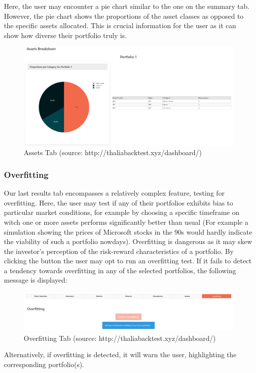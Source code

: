 \documentclass[main.tex]{subfiles}
\begin{document}
Here, the user may encounter a pie chart similar to the one on the summary tab. However, the pie chart shows the proportions of the asset classes as opposed to the specific assets allocated. This is crucial information for the user as it can show how diverse their portfolio truly is.

\begin{figure}[H]
   \centering
   \includegraphics[width=\textwidth]{08Appendices/081User/081Pictures/assets.png}
   \caption{Assets Tab (source: http://thaliabacktest.xyz/dashboard/)}
   \label{assets_tab}
\end{figure}

\subsubsection{Overfitting}

Our last results tab encompasses a relatively complex feature, testing for overfitting. Here, the user may test if any of their portfolios exhibits bias to particular market conditions, for example by choosing a specific timeframe on witch one or more assets performs significantly better than usual (For example a simulation showing the prices of Microsoft stocks in the 90s would hardly indicate the viability of such a portfolio nowdays). Overfitting is dangerous as it may skew the investor's perception of the risk-reward characteristics of a portfolio. By clicking the button the user may opt to run an overfitting test. If it fails to detect a tendency towards overfitting in any of the selected portfolios, the following message is displayed:

\begin{figure}[H]
   \centering
   \includegraphics[width=\textwidth]{08Appendices/081User/081Pictures/overfitting.png}
   \caption{Overfitting Tab (source: http://thaliabacktest.xyz/dashboard/)}
   \label{overfitting}
\end{figure}

Alternatively, if overfitting is detected, it will warn the user, highlighting the corresponding portfolio(s).
\end{document}
